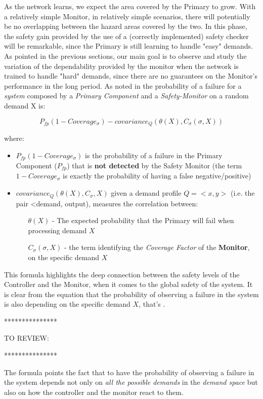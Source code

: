 As the network learns, we expect the area covered by the Primary to grow. With a relatively simple Monitor, in relatively simple scenarios, there will potentially be no overlapping between the hazard areas covered by the two. In this phase, the safety gain provided by the use of a (correctly implemented) safety checker will be remarkable, since the Primary is still learning to handle "easy" demands. As pointed in the previous sections, our main goal is to observe and study the variation of the dependability provided by the monitor when the network is trained to handle "hard" demands, since there are no guarantees on the Monitor's performance in the long period.\newline
As noted in \cite{striginiPopov} the probability of a failure for a \textsl{system} composed by a \textsl{Primary Component} and a \textsl{Safety-Monitor} on a random demand X is:

\begin{equation}
P_{fp} (1 - Coverage_{\sigma}) - covariance_{Q} (\theta (X), C_{\sigma} (\sigma , X))
\end{equation}

where:

\begin{itemize}
	\item $P_{fp} (1 - Coverage_{\sigma})$ is the probability of a failure in the Primary Component ($P_{fp}$) that is \textbf{not detected} by the Safety Monitor (the term $1 - Coverage_{\sigma}$ is exactly the probability of having a false negative/positive)
	\item $covariance_{Q} (\theta (X), C_{\sigma}, X)$ given a demand profile $Q = <x, y>$ (i.e. the pair <demand, output), measures the correlation between:
	\begin{itemize}
		\item[$\theta (X)$ -] The expected probability that the Primary will fail when processing demand $X$
		\item[$C_{\sigma} (\sigma, X)$ -] the term identifying the \textsl{Coverage Factor} of the \textbf{Monitor}, on the specific demand $X$
	\end{itemize}
\end{itemize}

This formula highlights the deep connection between the safety levels of the Controller and the Monitor, when it comes to the global safety of the system. It is clear from the equation that the probability of observing a failure in the system is also depending on the specific demand $X$, that's 
.\newline

***************\newline

TO REVIEW:\newline

***************\newline

The formula points the fact that to have the probability of observing a failure in the system depends not only on \textsl{all the possible demands} in the \textsl{demand space} but also on how the controller and the monitor react to them.\newline


